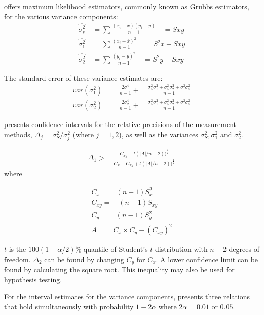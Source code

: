 \documentclass[12pt, a4paper]{report}
\theoremstyle{plain}
\theoremstyle{definition}
\theoremstyle{remark}
\begin{document}
	\citet{Grubbs48} offers maximum likelihood estimators, commonly
	known as Grubbs estimators, for the various variance components:
	\begin{eqnarray}
	\hat{\sigma^{2}_{s}} \quad= \sum{\frac{(x_{i}-\bar{x})(y_{i}-\bar{y})}{n-1}}\quad=Sxy\\
	\hat{\sigma^{2}_{1}} \quad= \sum{\frac{(x_{i}-\bar{x})^{2}}{n-1}} \quad=S^{2}x-Sxy \nonumber\\
	\hat{\sigma^{2}_{2}} \quad=
	\sum{\frac{(y_{i}-\bar{y})^{2}}{n-1}}\quad=S^{2}y-Sxy \nonumber
	\nonumber
	\end{eqnarray}
	
	The standard error of these variance estimates are:
	\begin{eqnarray}
	var(\sigma^{2}_{1}) =\quad \frac{2\sigma^{4}_{1}}{n-1} +\quad
	\frac{\sigma^2_{S}\sigma^2_{1}+\sigma^2_{S}\sigma^2_{2}+\sigma^2_{1}\sigma^2_{2}
	}{n-1}\\
	var(\sigma^{2}_{2}) =\quad \frac{2\sigma^{4}_{2}}{n-1} +\quad
	\frac{\sigma^2_{S}\sigma^2_{1}+\sigma^2_{S}\sigma^2_{2}+\sigma^2_{1}\sigma^2_{2}
	}{n-1}\nonumber
	\end{eqnarray}
	
	\citet{Thompson}presents confidence intervals for the relative
	precisions of the measurement methods, $\Delta_{j}=
	\sigma^2_{S}/\sigma^2_{j}$ (where $j=1,2$), as well as the
	variances $\sigma^{2}_{S}, \sigma^{2}_{1}$ and $\sigma^{2}_{2}$.
	
	\begin{eqnarray}
	\Delta_{1} >\quad \frac{C_{xy}-
		t(|A|/n-2))^{\frac{1}{2}}}{C_{x}-C_{xy}+
		t(|A|/n-2))^{\frac{1}{2}}}
	\end{eqnarray}
	where
	
	\begin{eqnarray}
	C_{x}=\quad(n-1)S^2_{x}\nonumber\\
	C_{xy}=\quad(n-1)S_{xy}\nonumber\\
	C_{y}=\quad(n-1)S^2_{y}\nonumber\\
	A=\quad C_{x}\times C_{y} - (C_{xy})^2 \nonumber
	\end{eqnarray}
	
	$t$ is the $100(1-\alpha/2)\%$ quantile of Student's $t$
	distribution with $n-2$ degrees of freedom. $\Delta_{2}$ can be
	found by changing $C_{y}$ for $C_{x}$. A lower confidence limit
	can be found by calculating the square root. This inequality may
	also be used for hypothesis testing.
	
	For the interval estimates for the variance components,
	\citet{Thompson} presents three relations that hold simultaneously
	with probability $1-2\alpha$ where $2\alpha=0.01$ or $0.05$.
	
\end{document}
